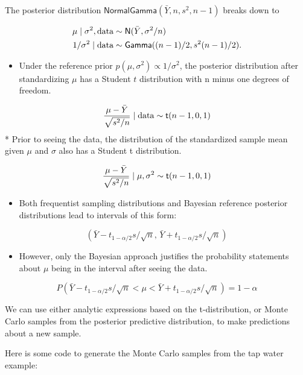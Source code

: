 \documentclass[]{book}
\providecommand{\tightlist}{%
  \setlength{\itemsep}{0pt}\setlength{\parskip}{0pt}}
\theoremstyle{definition}
\theoremstyle{definition}
\theoremstyle{definition}
\theoremstyle{remark}
\begin{document}
The posterior distribution
\(\textsf{NormalGamma}(\bar{Y}, n, s^2, n-1)\) breaks down to

\[\begin{aligned}
\mu \mid \sigma^2, \text{data} & \sim \textsf{N}(\bar{Y}, \sigma^2/n) \\
1/\sigma^2  \mid \text{data} & \sim \textsf{Gamma}((n-1)/2, s^2(n - 1)/2).
\end{aligned}\]

\begin{itemize}
\tightlist
\item
  Under the reference prior \(p(\mu, \sigma^2) \propto 1/\sigma^2\), the
  posterior distribution after standardizing \(\mu\) has a Student \(t\)
  distribution with n minus one degrees of freedom.
\end{itemize}

\[\frac{\mu - \bar{Y}}{\sqrt{s^2/n}} \mid \text{data} \sim  \textsf{t}(n-1, 0, 1)\] *
Prior to seeing the data, the distribution of the standardized sample
mean given \(\mu\) and \(\sigma\) also has a Student t distribution.

\[\frac{\mu - \bar{Y}}{\sqrt{s^2/n}} \mid \mu, \sigma^2 \sim  \textsf{t}(n-1, 0, 1) \]

\begin{itemize}
\tightlist
\item
  Both frequentist sampling distributions and Bayesian reference
  posterior distributions lead to intervals of this form:
\end{itemize}

\[(\bar{Y} - t_{1 - \alpha/2} s/\sqrt{n}, \, \bar{Y} + t_{1 - \alpha/2} s/\sqrt{n})\]

\begin{itemize}
\tightlist
\item
  However, only the Bayesian approach justifies the probability
  statements about \(\mu\) being in the interval after seeing the data.
\end{itemize}

\[P(\bar{Y} - t_{1 - \alpha/2} s/\sqrt{n} < \mu <  \bar{Y} + t_{1 - \alpha/2} s/\sqrt{n}) = 1 - \alpha\]

We can use either analytic expressions based on the t-distribution, or
Monte Carlo samples from the posterior predictive distribution, to make
predictions about a new sample.

Here is some code to generate the Monte Carlo samples from the tap water
example:
\end{document}
